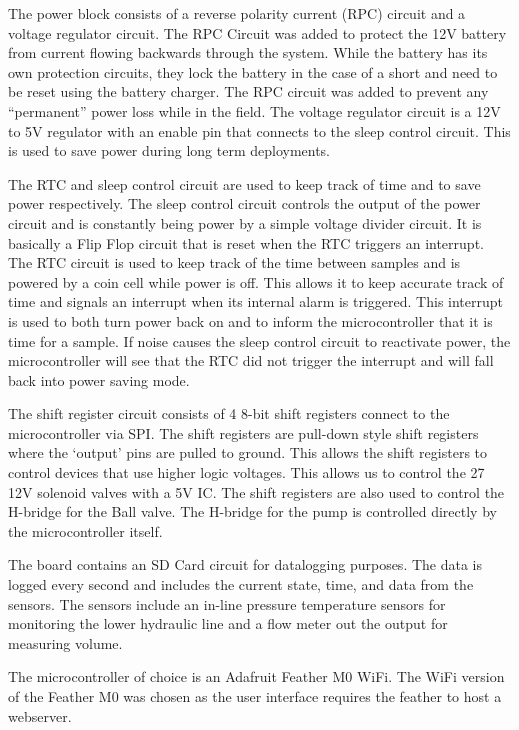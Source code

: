 \documentclass[11pt, letterpaper]{article}
\begin{document}
The power block consists of a reverse polarity current (RPC) circuit and a voltage regulator circuit. The RPC Circuit was added to protect the 12V battery from current flowing backwards through the system. While the battery has its own protection circuits, they lock the battery in the case of a short and need to be reset using the battery charger. The RPC circuit was added to prevent any “permanent” power loss while in the field. The voltage regulator circuit is a 12V to 5V regulator with an enable pin that connects to the sleep control circuit. This is used to save power during long term deployments. 
\newline\par
The RTC and sleep control circuit are used to keep track of time and to save power respectively. The sleep control circuit controls the output of the power circuit and is constantly being power by a simple voltage divider circuit. It is basically a Flip Flop circuit that is reset when the RTC triggers an interrupt. The RTC circuit is used to keep track of the time between samples and is powered by a coin cell while power is off. This allows it to keep accurate track of time and signals an interrupt when its internal alarm is triggered. This interrupt is used to both turn power back on and to inform the microcontroller that it is time for a sample. If noise causes the sleep control circuit to reactivate power, the microcontroller will see that the RTC did not trigger the interrupt and will fall back into power saving mode. 
\newline\par
The shift register circuit consists of 4 8-bit shift registers connect to the microcontroller via SPI. The shift registers are pull-down style shift registers where the ‘output’ pins are pulled to ground. This allows the shift registers to control devices that use higher logic voltages. This allows us to control the 27 12V solenoid valves with a 5V IC. The shift registers are also used to control the H-bridge for the Ball valve. The H-bridge for the pump is controlled directly by the microcontroller itself. 
\newline\par
The board contains an SD Card circuit for datalogging purposes. The data is logged every second and includes the current state, time, and data from the sensors. The sensors include an in-line pressure temperature sensors for monitoring the lower hydraulic line and a flow meter out the output for measuring volume.
\newline\par
The microcontroller of choice is an Adafruit Feather M0 WiFi. The WiFi version of the Feather M0 was chosen as the user interface requires the feather to host a webserver. 
\end{document}
